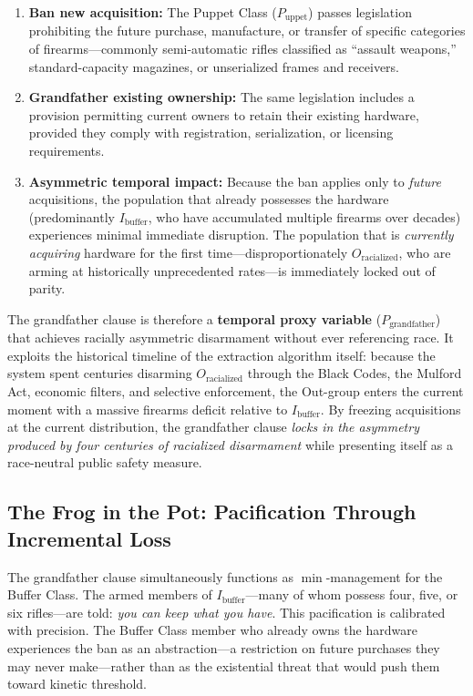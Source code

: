 \documentclass[12pt,openany]{book}
\begin{document}
\begin{enumerate}
    \item \textbf{Ban new acquisition:} The Puppet Class ($P_{\text{uppet}}$) passes legislation prohibiting the future purchase, manufacture, or transfer of specific categories of firearms---commonly semi-automatic rifles classified as ``assault weapons,'' standard-capacity magazines, or unserialized frames and receivers.

    \item \textbf{Grandfather existing ownership:} The same legislation includes a provision permitting current owners to retain their existing hardware, provided they comply with registration, serialization, or licensing requirements.

    \item \textbf{Asymmetric temporal impact:} Because the ban applies only to \textit{future} acquisitions, the population that already possesses the hardware (predominantly $I_{\text{buffer}}$, who have accumulated multiple firearms over decades) experiences minimal immediate disruption. The population that is \textit{currently acquiring} hardware for the first time---disproportionately $O_{\text{racialized}}$, who are arming at historically unprecedented rates---is immediately locked out of parity.
\end{enumerate}

The grandfather clause is therefore a \textbf{temporal proxy variable} ($P_{\text{grandfather}}$) that achieves racially asymmetric disarmament without ever referencing race. It exploits the historical timeline of the extraction algorithm itself: because the system spent centuries disarming $O_{\text{racialized}}$ through the Black Codes, the Mulford Act, economic filters, and selective enforcement, the Out-group enters the current moment with a massive firearms deficit relative to $I_{\text{buffer}}$. By freezing acquisitions at the current distribution, the grandfather clause \textit{locks in the asymmetry produced by four centuries of racialized disarmament} while presenting itself as a race-neutral public safety measure.

\subsection{The Frog in the Pot: Pacification Through Incremental Loss}

The grandfather clause simultaneously functions as $\min$-management for the Buffer Class. The armed members of $I_{\text{buffer}}$---many of whom possess four, five, or six rifles---are told: \textit{you can keep what you have}. This pacification is calibrated with precision. The Buffer Class member who already owns the hardware experiences the ban as an abstraction---a restriction on future purchases they may never make---rather than as the existential threat that would push them toward kinetic threshold.
\end{document}
